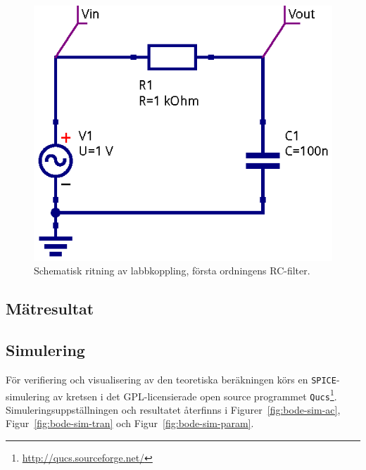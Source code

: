 \begin{figure}
    \centering
    \includegraphics[width=0.8\linewidth]{sim/ee466_lab-4_prj/uppgift-0_schema}
    \caption[Schematisk ritning av labbkoppling, första ordningens RC-filter.]
    {Schematisk ritning av labbkoppling, första ordningens RC-filter.}
    \label{fig:rc-schema}
\end{figure}


\subsection{Mätresultat}\label{}

\subsection{Simulering}\label{}
För verifiering och visualisering av den teoretiska beräkningen körs en
\texttt{SPICE}-simulering av kretsen i det GPL-licensierade open source
programmet \texttt{Qucs}\footnote{\url{http://qucs.sourceforge.net/}}.
Simuleringsuppställningen och resultatet återfinns i
Figurer~\ref{fig:bode-sim-ac}, Figur~\ref{fig:bode-sim-tran} och
Figur~\ref{fig:bode-sim-param}.

